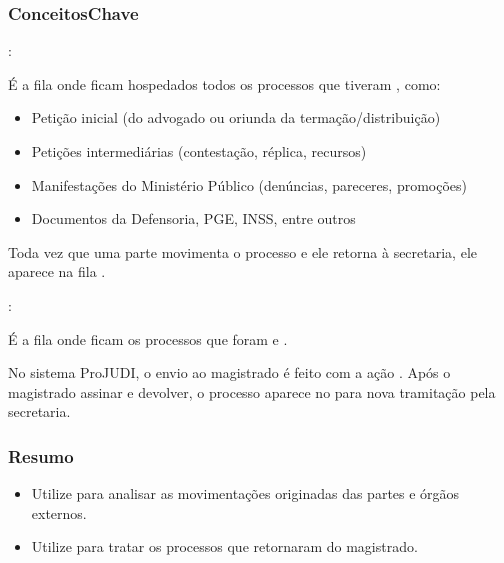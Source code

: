 \documentclass[letterpaper,10pt,brazil]{sphinxmanual}
\begin{document}
\subsubsection{Conceitos\sphinxhyphen{}Chave}
\label{\detokenize{projud_05_analisejuntada:conceitos-chave}}
\sphinxAtStartPar
{}:

\sphinxAtStartPar
É a fila onde ficam hospedados todos os processos que tiveram , como:
\begin{itemize}
\item {} 
\sphinxAtStartPar
Petição inicial (do advogado ou oriunda da termação/distribuição)

\item {} 
\sphinxAtStartPar
Petições intermediárias (contestação, réplica, recursos)

\item {} 
\sphinxAtStartPar
Manifestações do Ministério Público (denúncias, pareceres, promoções)

\item {} 
\sphinxAtStartPar
Documentos da Defensoria, PGE, INSS, entre outros

\end{itemize}

\sphinxAtStartPar
Toda vez que uma parte movimenta o processo e ele retorna à secretaria, ele aparece na fila .

\sphinxAtStartPar
{}:

\sphinxAtStartPar
É a fila onde ficam os processos que foram  e .

\sphinxAtStartPar
No sistema ProJUDI, o envio ao magistrado é feito com a ação . Após o magistrado assinar e devolver, o processo aparece no  para nova tramitação pela secretaria.


\subsubsection{Resumo}
\label{\detokenize{projud_05_analisejuntada:resumo}}\begin{itemize}
\item {} 
\sphinxAtStartPar
Utilize  para analisar as movimentações originadas das partes e órgãos externos.

\item {} 
\sphinxAtStartPar
Utilize  para tratar os processos que retornaram do magistrado.

\end{itemize}
\end{document}
